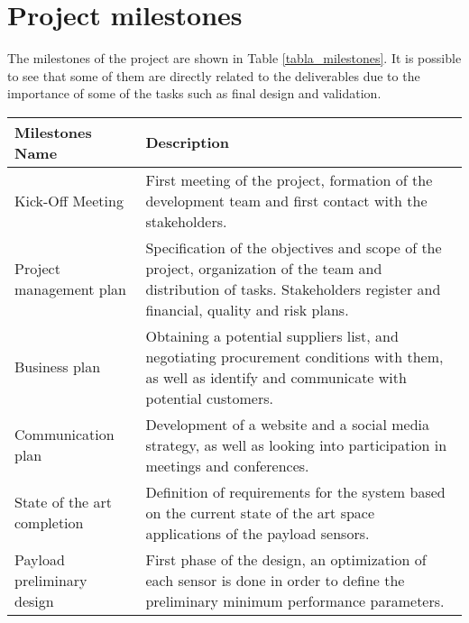\section{Project milestones}
The milestones of the project are shown in Table \ref{tabla_milestones}. It is possible to see that some of them are directly related to the deliverables due to the importance of some of the tasks such as final design and validation.
\begin{longtable}[H]{>{\raggedright\arraybackslash}p{4cm} p{10cm}}
	
	\toprule[2pt]
	
	\textbf{Milestones Name} &  \textbf{Description} \\
	
	\midrule [1.5pt]
	\endhead
	
	Kick-Off Meeting & First meeting of the project, formation of the development team and first contact with the stakeholders.\vspace{0.2cm} \\
	
	\midrule
	
	Project management plan & Specification of the objectives and scope of the project, organization of the team and distribution of tasks. Stakeholders register and financial, quality and risk plans.\vspace{0.2cm} \\
	
	\midrule
	
	Business plan & Obtaining a potential suppliers list, and negotiating procurement conditions with them, as well as identify and communicate with potential customers.\vspace{0.2cm} \\
	
	\midrule
	
	Communication plan & Development of a website and a social media strategy, as well as looking into participation in meetings and conferences.\vspace{0.2cm} \\
	
	\midrule
	
	State of the art completion & Definition of requirements for the system based on the current state of the art space applications of the payload sensors.\vspace{0.2cm} \\
	
	\midrule  
	
	Payload preliminary design & First phase of the design, an optimization of each sensor is done in order to define the preliminary minimum performance parameters.\vspace{0.2cm} \\
	

\end{longtable}
